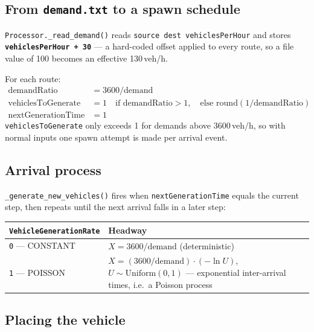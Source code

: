 \documentclass[11pt, a4paper]{article}
\newcommand{\code}[1]{\texttt{#1}}
\begin{document}
\subsection{From \code{demand.txt} to a spawn schedule}

\code{Processor.\_read\_demand()} reads \code{source dest vehiclesPerHour} and
stores \textbf{\code{vehiclesPerHour + 30}} --- a hard-coded offset applied to
every route, so a file value of 100 becomes an effective 130\,veh/h.

For each route:
\begin{align*}
    \text{demandRatio} &= 3600 / \text{demand} \\
    \text{vehiclesToGenerate} &= 1 \quad\text{if demandRatio} > 1, \quad
        \text{else } \text{round}(1/\text{demandRatio}) \\
    \text{nextGenerationTime} &= 1
\end{align*}
\code{vehiclesToGenerate} only exceeds 1 for demands above 3600\,veh/h, so with
normal inputs one spawn attempt is made per arrival event.

\subsection{Arrival process}

\code{\_generate\_new\_vehicles()} fires when \code{nextGenerationTime} equals
the current step, then repeats until the next arrival falls in a later step:

\begin{center}
\begin{tabularx}{\textwidth}{l X}
\toprule
\textbf{\code{VehicleGenerationRate}} & \textbf{Headway} \\
\midrule
\code{0} --- CONSTANT & $X = 3600/\text{demand}$ (deterministic) \\
\code{1} --- POISSON & $X = (3600/\text{demand})\cdot(-\ln U)$, $U \sim \text{Uniform}(0,1)$ --- exponential inter-arrival times, i.e.\ a Poisson process \\
\bottomrule
\end{tabularx}
\end{center}

\subsection{Placing the vehicle}
\end{document}
